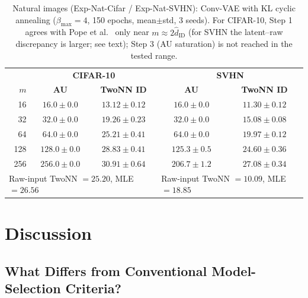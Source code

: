 \documentclass[make,article,submit,pdftex,moreauthors]{Definitions/mdpi}
\newcommand{\hatdID}{\hat{d}_{\mathrm{ID}}}
\begin{document}
\begin{table}[H]
\caption{Natural images (Exp-Nat-Cifar / Exp-Nat-SVHN): Conv-VAE with KL
cyclic annealing ($\beta_{\max} = 4$, 150 epochs, mean$\pm$std, 3 seeds).
For CIFAR-10, Step 1 agrees with Pope et al.~\cite{pope2021intrinsic} only
near $m \approx 2\hatdID$ (for SVHN the latent--raw discrepancy is larger;
see text); Step 3 (AU saturation) is not reached in the tested range.}
\label{tab:natural}
\small
\begin{tabular}{r cc | cc}
\toprule
 & \multicolumn{2}{c|}{\textbf{CIFAR-10}} & \multicolumn{2}{c}{\textbf{SVHN}} \\
$m$ & \textbf{AU} & \textbf{TwoNN ID} & \textbf{AU} & \textbf{TwoNN ID} \\
\midrule
 16 & $16.0 \pm 0.0$ & $13.12 \pm 0.12$ & $16.0 \pm 0.0$ & $11.30 \pm 0.12$ \\
 32 & $32.0 \pm 0.0$ & $19.26 \pm 0.23$ & $32.0 \pm 0.0$ & $15.08 \pm 0.08$ \\
 64 & $64.0 \pm 0.0$ & $\mathbf{25.21 \pm 0.41}$ & $64.0 \pm 0.0$ & $19.97 \pm 0.12$ \\
128 & $128.0 \pm 0.0$ & $28.83 \pm 0.41$ & $125.3 \pm 0.5$ & $24.60 \pm 0.36$ \\
256 & $256.0 \pm 0.0$ & $30.91 \pm 0.64$ & $206.7 \pm 1.2$ & $27.08 \pm 0.34$ \\
\midrule
\multicolumn{3}{l|}{Raw-input TwoNN $= 25.20$, MLE $= 26.56$} &
\multicolumn{2}{l}{Raw-input TwoNN $= 10.09$, MLE $= 18.85$} \\
\bottomrule
\end{tabular}
\end{table}

\section{Discussion}\label{sec:discussion}

\subsection{What Differs from Conventional Model-Selection Criteria?}\label{sec:disc_model_selection}
\end{document}

